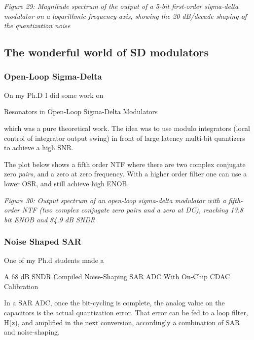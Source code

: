 {
\centering
{}
}

\emph{Figure 29: Magnitude spectrum of the output of a 5-bit first-order
sigma-delta modulator on a logarithmic frequency axis, showing the 20
dB/decade shaping of the quantization noise}

\subsection{The wonderful world of SD
modulators}\label{the-wonderful-world-of-sd-modulators}

\subsubsection{Open-Loop Sigma-Delta}\label{open-loop-sigma-delta}

On my Ph.D I did some work on

Resonators in Open-Loop Sigma-Delta Modulators

which was a pure theoretical work. The idea was to use modulo
integrators (local control of integrator output swing) in front of large
latency multi-bit quantizers to achieve a high SNR.

The plot below shows a fifth order NTF where there are two complex
conjugate zero \emph{pairs}, and a zero at zero frequency. With a higher
order filter one can use a lower OSR, and still achieve high ENOB.


{
\centering
{}
}

\emph{Figure 30: Output spectrum of an open-loop sigma-delta modulator
with a fifth-order NTF (two complex conjugate zero pairs and a zero at
DC), reaching 13.8 bit ENOB and 84.9 dB SNDR}

\subsubsection{Noise Shaped SAR}\label{noise-shaped-sar}

One of my Ph.d students made a

A 68 dB SNDR Compiled Noise-Shaping SAR ADC With On-Chip CDAC
Calibration 

In a SAR ADC, once the bit-cycling is complete, the analog value on the
capacitors is the actual quantization error. That error can be fed to a
loop filter, H(z), and amplified in the next conversion, accordingly a
combination of SAR and noise-shaping.

